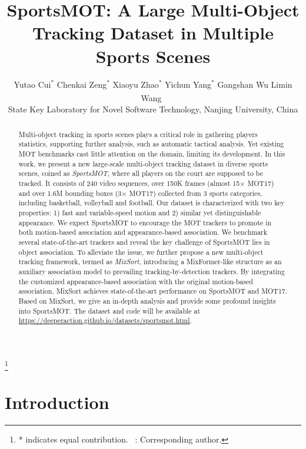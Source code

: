 \documentclass[10pt,twocolumn,letterpaper]{article}
\newcommand\blfootnote[1]{\begingroup
  \renewcommand\thefootnote{}\footnote{#1}\addtocounter{footnote}{-1}\endgroup
}
\begin{document}
\title{SportsMOT: A Large Multi-Object Tracking Dataset in Multiple Sports Scenes}

\author
{
Yutao Cui$^{*}$ \quad
Chenkai Zeng$^{*}$ \quad
Xiaoyu Zhao$^{*}$ \quad
Yichun Yang$^{*}$ \quad
Gangshan Wu \quad
Limin Wang\textsuperscript{~\Letter}
\\[0.2cm]
State Key Laboratory for Novel Software Technology,
Nanjing University,
China
}
\maketitle

\blfootnote{* indicates equal contribution. \Letter~: Corresponding author.}


\begin{abstract}
Multi-object tracking in sports scenes plays a critical role in gathering players statistics, supporting further analysis, such as automatic tactical analysis. 
Yet existing MOT benchmarks cast little attention on the domain, limiting its development.
In this work, we present a new large-scale multi-object tracking dataset in diverse sports scenes, coined as \emph{SportsMOT}, where all players on the court are supposed to be tracked.
It consists of 240 video sequences, over 150K frames (almost 15× MOT17) and over 1.6M bounding boxes (3× MOT17) collected from 3 sports categories, including basketball, volleyball and football. 
Our dataset is characterized with two key properties: 1) fast and variable-speed motion and 2) similar yet distinguishable appearance. 
We expect SportsMOT to encourage the MOT trackers to promote in both motion-based association and appearance-based association.
We benchmark several state-of-the-art trackers and reveal the key challenge of SportsMOT lies in object association.
To alleviate the issue, we further propose a new multi-object tracking framework, termed as \emph{MixSort}, introducing a MixFormer-like structure as an auxiliary association model to prevailing tracking-by-detection trackers.
By integrating the customized appearance-based association with the original motion-based association, MixSort achieves state-of-the-art performance on SportsMOT and MOT17.
Based on MixSort, we give an in-depth analysis and provide some profound insights into SportsMOT.
The dataset and code will be available at \url{https://deeperaction.github.io/datasets/sportsmot.html}.  
\end{abstract}

\section{Introduction}
\label{sec:intro}
\end{document}
